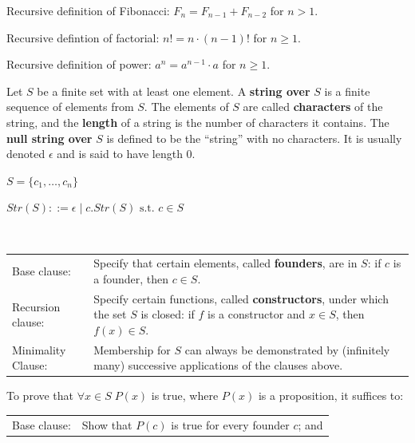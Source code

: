 \documentclass{article}
\begin{document}
\begin{description}
    \item \qquad Recursive definition of Fibonacci: $F_{n} = F_{n-1} + F_{n-2}$ for $n>1$.
    \item \qquad Recursive defintion of factorial: $n! = n\cdot (n-1)!$ for $n\geq 1$.
    \item \qquad Recursive definition of power: $a^{n}=a^{n-1}\cdot a$ for $n\geq 1$.
    \item[Recursively Defined Sets]Let $S$ be a finite set with at least one element. A \textbf{string over} $S$ is a finite sequence of elements from $S$. The elements of $S$ are called \textbf{characters} of the string, and the \textbf{length} of a string is the number of characters it contains. The \textbf{null string over} $S$ is defined to be the “string” with no
characters. It is usually denoted $\epsilon$ and is said to have length 0.
	\item \qquad $S=\{c_{1},\dots,c_{n}\}$ 
	\item \qquad $Str(S) ::= \epsilon \;|\;c.Str(S) \text{ s.t. } c\in S$
	\item[Recursive Definition of a set $S$] \
	\begingroup
	\setlength{\tabcolsep}{6pt} %
	\renewcommand{\arraystretch}{1.5} %
	\begin{table}[h]
		\centering
		\begin{tabular}{lp{6in}}
			Base clause: & Specify that certain elements, called \textbf{founders}, are in $S$: if $c$ is a founder, then $c\in S$. \\
			Recursion clause: & Specify certain functions, called \textbf{constructors}, under which the set $S$ is closed: if $f$ is a constructor and $x\in S$, then $f(x)\in S$. \\
			Minimality Clause: & Membership for $S$ can always be demonstrated by (infinitely many) successive applications of the clauses above. \\
		\end{tabular}
	\end{table}	     
	\endgroup
	\item[Structural Induction over $S$] To prove that $\forall x\in S\; P(x)$ is true, where $P(x)$ is a proposition, it suffices to:
	\begingroup
	\setlength{\tabcolsep}{6pt} %
	\renewcommand{\arraystretch}{1.5} %
	\begin{table}[h]
		\centering
		\begin{tabular}{lp{6in}}
			Base clause: & Show that $P(c)$ is true for every founder $c$; and \\

\end{tabular}
\end{table}
\end{description}
\end{document}
